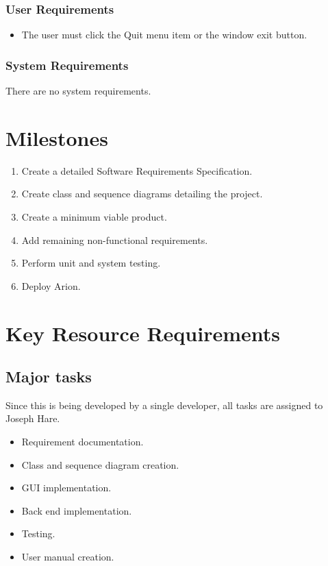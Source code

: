 \documentclass{scrreprt}
\begin{document}
    \subsection*{User Requirements}
        \begin{itemize}
            \item The user must click the Quit menu item or the window exit button.
        \end{itemize}

    \subsection*{System Requirements}
        There are no system requirements.


\chapter{Milestones}
    \begin{enumerate}[1.]
        \item Create a detailed Software Requirements Specification.
        \item Create class and sequence diagrams detailing the project.
        \item Create a minimum viable product.
        \item Add remaining non-functional requirements.
        \item Perform unit and system testing.
        \item Deploy Arion.
    \end{enumerate}


\chapter{Key Resource Requirements}

\section{Major tasks}
Since this is being developed by a single developer, all tasks are assigned to Joseph Hare.
\begin{itemize}
    \item Requirement documentation.
    \item Class and sequence diagram creation.
    \item GUI implementation.
    \item Back end implementation.
    \item Testing.
    \item User manual creation.
\end{itemize}
\end{document}
